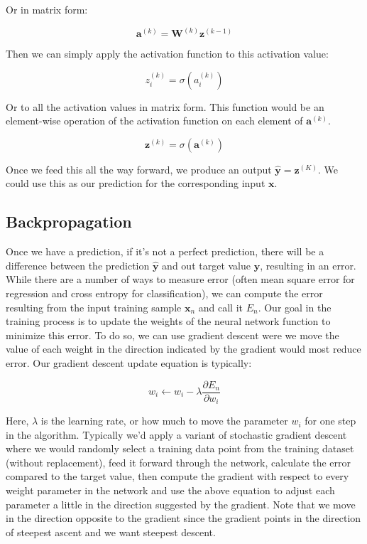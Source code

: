 \documentclass{article}
\begin{document}
Or in matrix form:

\begin{equation}
    \mathbf{a}^{(k)} = \mathbf{W}^{(k)} \mathbf{z}^{(k-1)}
\end{equation}

Then we can simply apply the activation function to this activation value:

\begin{equation}
    z_i^{(k)} = \sigma(a_i^{(k)})
\end{equation}

Or to all the activation values in matrix form. This function would be an element-wise operation of the activation function on each element of $\mathbf{a}^{(k)}$.

\begin{equation}
    \mathbf{z}^{(k)} = \sigma(\mathbf{a}^{(k)})
\end{equation}

Once we feed this all the way forward, we produce an output $\hat{\mathbf{y}} = \mathbf{z}^{(K)}$. We could use this as our prediction for the corresponding input $\mathbf{x}$.



\subsection{Backpropagation}

Once we have a prediction, if it's not a perfect prediction, there will be a difference between the prediction $\hat{\mathbf{y}}$ and out target value $\mathbf{y}$, resulting in an error. While there are a number of ways to measure error (often mean square error for regression and cross entropy for classification), we can compute the error resulting from the input training sample $\mathbf{x}_n$ and call it $E_n$. Our goal in the training process is to update the weights of the neural network function to minimize this error. To do so, we can use gradient descent were we move the value of each weight in the direction indicated by the gradient would most reduce error. Our gradient descent update equation is typically:

\begin{equation}
    w_i \leftarrow w_i - \lambda \dfrac{\partial E_n}{\partial w_i}
\end{equation}

Here, $\lambda$ is the learning rate, or how much to move the parameter $w_i$ for one step in the algorithm. Typically we'd apply a variant of stochastic gradient descent where we would randomly select a training data point from the training dataset (without replacement), feed it forward through the network, calculate the error compared to the target value, then compute the gradient with respect to every weight parameter in the network and use the above equation to adjust each parameter a little in the direction suggested by the gradient. Note that we move in the direction opposite to the gradient since the gradient points in the direction of steepest ascent and we want steepest descent.
\end{document}
